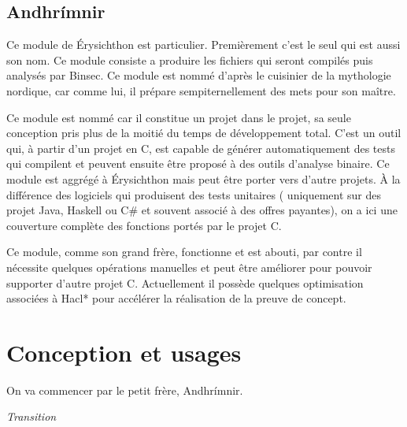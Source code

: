 \subsection*{Andhrímnir}

Ce module de Érysichthon est particulier. Premièrement c'est le seul qui est aussi son nom. Ce module consiste a produire les fichiers qui seront compilés puis analysés par Binsec. Ce module est nommé d'après le cuisinier de la mythologie nordique, car comme lui, il prépare sempiternellement des mets pour son maître.\smallbreak

Ce module est nommé car il constitue un projet dans le projet, sa seule conception pris plus de la moitié du temps de développement total. C'est un outil qui, à partir d'un projet en C, est capable de générer automatiquement des tests qui compilent et peuvent ensuite être proposé à des outils d'analyse binaire. Ce module est aggrégé à Érysichthon mais peut être porter vers d'autre projets. À la différence des logiciels qui produisent des tests unitaires ( uniquement sur des projet Java, Haskell ou C\# et souvent associé à des offres payantes), on a ici une couverture complète des fonctions portés par le projet C.\smallbreak

Ce module, comme son grand frère, fonctionne et est abouti, par contre il nécessite quelques opérations manuelles et peut être améliorer pour pouvoir supporter d'autre projet C. Actuellement il possède quelques optimisation associées à Hacl* pour accélérer la réalisation de la preuve de concept.

\section{Conception et usages}

On va commencer par le petit frère, Andhrímnir.





\vfill
\textit{Transition}